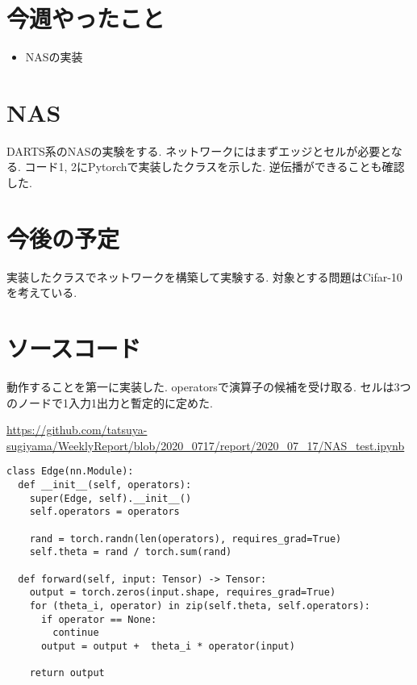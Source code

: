 \documentclass[twocolumn]{jarticle}     %
\begin{document}


\section{今週やったこと}
\begin{itemize}
	\item {NASの実装}
\end{itemize}

\section{NAS}
DARTS系のNASの実験をする.
ネットワークにはまずエッジとセルが必要となる.
コード1, 2にPytorchで実装したクラスを示した.
逆伝播ができることも確認した.


\section{今後の予定}
実装したクラスでネットワークを構築して実験する.
対象とする問題はCifar-10を考えている.


\section{ソースコード}

動作することを第一に実装した.
operatorsで演算子の候補を受け取る.
セルは3つのノードで1入力1出力と暫定的に定めた.

\url{https://github.com/tatsuya-sugiyama/WeeklyReport/blob/2020_0717/report/2020_07_17/NAS_test.ipynb}

\begin{lstlisting}[caption=Edge,label=Edge]
class Edge(nn.Module):
  def __init__(self, operators):
    super(Edge, self).__init__()
    self.operators = operators

    rand = torch.randn(len(operators), requires_grad=True)
    self.theta = rand / torch.sum(rand)

  def forward(self, input: Tensor) -> Tensor:
    output = torch.zeros(input.shape, requires_grad=True)
    for (theta_i, operator) in zip(self.theta, self.operators):
      if operator == None:
        continue
      output = output +  theta_i * operator(input)

    return output
\end{lstlisting}
\end{document}
